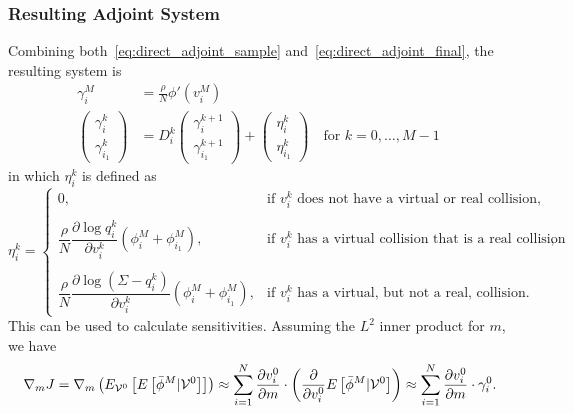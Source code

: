 \documentclass[12pt,nopreprintline]{elsarticle}
\begin{document}
\subsubsection{Resulting Adjoint System} 
Combining both~\eqref{eq:direct_adjoint_sample} and~\eqref{eq:direct_adjoint_final}, the resulting system is
\begin{subequations}\label{eq:gamma_rules}
\begin{align}
\gamma_i^M &= \frac{\rho}{N} \phi'(v_i^M) \label{eq:gamma_final_disc} \\
\begin{pmatrix} {\gamma_{i}^{k}}\\  {\gamma_{i_1}^{k}}\end{pmatrix} &=
D_i^k  \begin{pmatrix}
{\gamma_{i}^{k+1}}\\  {\gamma_{i_1}^{k+1}}  \end{pmatrix} +  \begin{pmatrix} {\eta_{i}^{k}}\\  {\eta_{i_1}^{k}}\end{pmatrix} \quad \mbox{for $k = 0,\ldots, M-1$} ~\label{eq:gamma_non_final_disc} 
\end{align}
\end{subequations}
in which $\eta_{i}^k$ is defined as
\begin{equation}\label{eq:back_eta}
\eta_i^k = 
    \begin{cases}
    0,  & \text{if $v_i^k$ does not have a virtual or real collision}, \\ 
    \quad \\
    \dfrac{\rho}{N} \dfrac{\partial \log q_i^k }{ \partial {v_i^k}} ( \phi^M_i + \phi^M_{i_1}), &  \text{if $v_i^k$ has a virtual collision that is a real collision},\\
     \quad \\
      \dfrac{\rho}{N}  \dfrac{\partial \log (\Sigma - q_i^k) }{ \partial {v_i^k}} ( \phi^M_i + \phi^M_{i_1}), &   \text{if $v_i^k$ has a virtual, but not a real, collision}.
    \end{cases}
\end{equation}
This can be used to calculate sensitivities.  Assuming the $L^2$ inner product for $m$, we have
\begin{equation*}
\nabla_m J = \nabla_m  \left( E_{\mathcal V^0 }\left[ E\left[\bar{\phi}^M | \mathcal V^0 \right] \right] \right) \approx  \sum_{i=1}^N \frac{\partial v^0_i}{\partial m}  \cdot \left(\frac{\partial}{\partial v_i^0}   E\left[\bar{\phi}^M | \mathcal V^0 \right] \right)
\approx  \sum_{i=1}^N  \frac{\partial v_{i}^0}{\partial m}\cdot \gamma_i^0.
\end{equation*}
\end{document}
